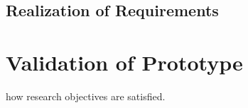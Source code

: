 	
	
	
	
	\subsection{Realization of Requirements}
	\label{subsec:realizationofrequirements}
	
	\section{Validation of Prototype}
	\label{sec:validation}
how research objectives are satisfied. 

	

	


